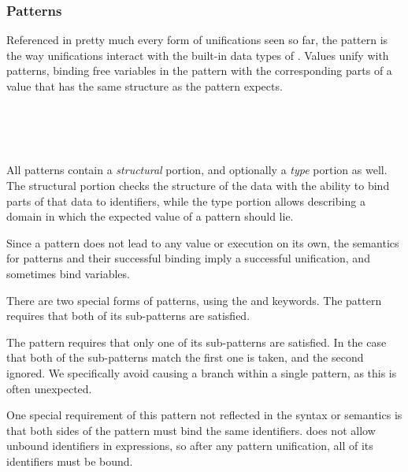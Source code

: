 \subsubsection{Patterns}
\label{sec:patterns}

Referenced in pretty much every form of unifications seen so far, the pattern is
the way unifications interact with the built-in data types of \Trilogy{}. Values
unify with patterns, binding free variables in the pattern with the corresponding
parts of a value that has the same structure as the pattern expects.

\begin{bnf*}
     \\
     \\
     \\
\end{bnf*}

All patterns contain a \emph{structural} portion, and optionally a \emph{type}
portion as well. The structural portion checks the structure of the data with
the ability to bind parts of that data to identifiers, while the type portion
allows describing a domain in which the expected value of a pattern should lie.

Since a pattern does not lead to any value or execution on its own, the semantics for
patterns and their successful binding imply a successful unification, and sometimes
bind variables.

There are two special forms of patterns, using the  and  keywords.
The  pattern requires that both of its sub-patterns are satisfied.

\begin{prooftree}
\end{prooftree}

The  pattern requires that only one of its sub-patterns are satisfied.
In the case that both of the sub-patterns match the first one is taken, and the
second ignored. We specifically avoid causing a branch within a single pattern,
as this is often unexpected.

One special requirement of this pattern not reflected in the syntax or
semantics is that both sides of the  pattern must bind the same
identifiers. \Trilogy{} does not allow unbound identifiers in expressions,
so after any pattern unification, all of its identifiers must be bound.

